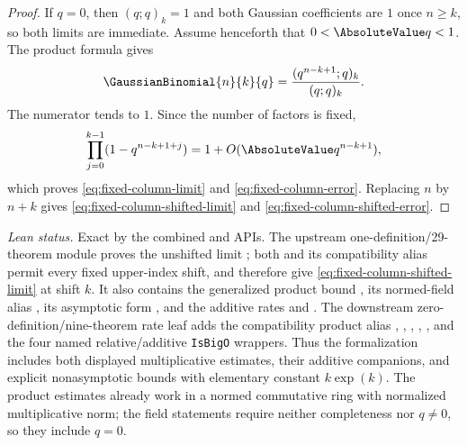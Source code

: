 \documentclass[11pt,a4paper,oneside,openany]{book}
\theoremstyle{definition}
\theoremstyle{remark}
\begin{document}
\begin{proof}
If $q=0$, then $(q;q)_k=1$ and both Gaussian coefficients are $1$ once
$n\ge k$, so both limits are immediate.  Assume henceforth that
$0<\AbsoluteValue q<1$.  The product formula gives
\[
 \GaussianBinomial{n}{k}{q}=\frac{(q^{n-k+1};q)_k}{(q;q)_k}.
\]
The numerator tends to $1$.  Since the number of factors is fixed,
\[
 \prod_{j=0}^{k-1}(1-q^{n-k+1+j})
 =1+O(\AbsoluteValue q^{n-k+1}),
\]
which proves \eqref{eq:fixed-column-limit} and
\eqref{eq:fixed-column-error}.  Replacing $n$ by $n+k$ gives
\eqref{eq:fixed-column-shifted-limit} and
\eqref{eq:fixed-column-shifted-error}.
\end{proof}
\emph{Lean status.}  Exact by the combined
 and
 APIs.  The upstream
one-definition/29-theorem module proves the unshifted limit
; both
 and its compatibility
alias  permit every fixed
upper-index shift, and therefore give \eqref{eq:fixed-column-shifted-limit} at
shift \(k\).  It also contains the generalized product bound
, its normed-field
alias ,
its asymptotic form
, and the additive rates
 and
.  The downstream
zero-definition/nine-theorem rate leaf adds the compatibility product alias
,
,
,
,
, and the
four named relative/additive \texttt{IsBigO} wrappers.  Thus the formalization
includes both displayed multiplicative estimates, their additive companions,
and explicit nonasymptotic bounds with elementary constant \(k\exp(k)\).
The product estimates already work in a normed commutative ring with
normalized multiplicative norm; the field statements require neither
completeness nor \(q\ne0\), so they include \(q=0\).
\end{document}

